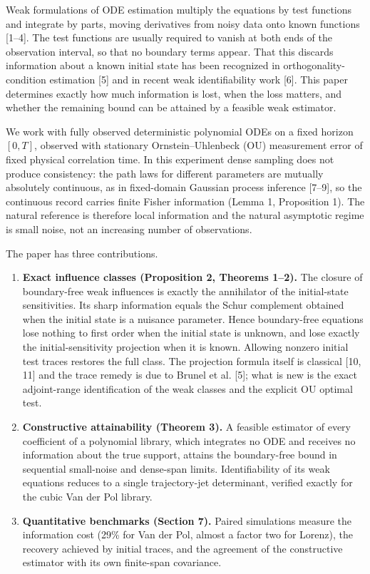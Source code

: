 \documentclass[
  american,
  11pt,
]{article}
\providecommand{\tightlist}{%
  \setlength{\itemsep}{0pt}\setlength{\parskip}{0pt}}
\begin{document}
Weak formulations of ODE estimation multiply the equations by test
functions and integrate by parts, moving derivatives from noisy data
onto known functions {[}1--4{]}. The test functions are usually required
to vanish at both ends of the observation interval, so that no boundary
terms appear. That this discards information about a known initial state
has been recognized in orthogonality-condition estimation {[}5{]} and in
recent weak identifiability work {[}6{]}. This paper determines exactly
how much information is lost, when the loss matters, and whether the
remaining bound can be attained by a feasible weak estimator.

We work with fully observed deterministic polynomial ODEs on a fixed
horizon \([0,T]\), observed with stationary Ornstein--Uhlenbeck (OU)
measurement error of fixed physical correlation time. In this experiment
dense sampling does not produce consistency: the path laws for different
parameters are mutually absolutely continuous, as in fixed-domain
Gaussian process inference {[}7--9{]}, so the continuous record carries
finite Fisher information (Lemma 1, Proposition 1). The natural
reference is therefore local information and the natural asymptotic
regime is small noise, not an increasing number of observations.

The paper has three contributions.

\begin{enumerate}
\def\labelenumi{\arabic{enumi}.}
\tightlist
\item
  \textbf{Exact influence classes (Proposition 2, Theorems 1--2).} The
  closure of boundary-free weak influences is exactly the annihilator of
  the initial-state sensitivities. Its sharp information equals the
  Schur complement obtained when the initial state is a nuisance
  parameter. Hence boundary-free equations lose nothing to first order
  when the initial state is unknown, and lose exactly the
  initial-sensitivity projection when it is known. Allowing nonzero
  initial test traces restores the full class. The projection formula
  itself is classical {[}10, 11{]} and the trace remedy is due to Brunel
  et al. {[}5{]}; what is new is the exact adjoint-range identification
  of the weak classes and the explicit OU optimal test.
\item
  \textbf{Constructive attainability (Theorem 3).} A feasible estimator
  of every coefficient of a polynomial library, which integrates no ODE
  and receives no information about the true support, attains the
  boundary-free bound in sequential small-noise and dense-span limits.
  Identifiability of its weak equations reduces to a single
  trajectory-jet determinant, verified exactly for the cubic Van der Pol
  library.
\item
  \textbf{Quantitative benchmarks (Section 7).} Paired simulations
  measure the information cost (29\% for Van der Pol, almost a factor
  two for Lorenz), the recovery achieved by initial traces, and the
  agreement of the constructive estimator with its own finite-span
  covariance.
\end{enumerate}
\end{document}
